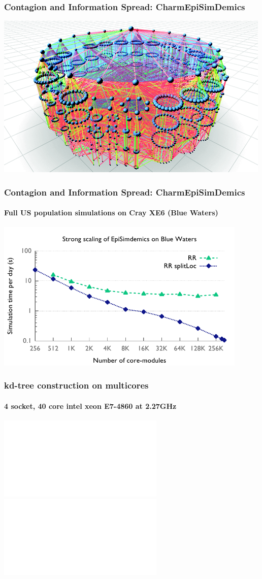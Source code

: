 \begin{frame}
\frametitle{Contagion and Information Spread: CharmEpiSimDemics}
\includegraphics[width=\textwidth]{../figures/contagion.png}
\end{frame}


\begin{frame}
\frametitle{Contagion and Information Spread: CharmEpiSimDemics}
\framesubtitle{Full US population simulations on Cray XE6 (Blue Waters)}
\begin{center}
\includegraphics[width=0.9\textwidth]{../figures/simdemics_strong_scaling.pdf}
\end{center}
\end{frame}


\begin{frame}
\frametitle{kd-tree construction on multicores}
\framesubtitle{4 socket, 40 core intel xeon E7-4860 at 2.27GHz}
\includegraphics<1>[height=\textheight]{../figures/kdtree/speedup_8.pdf}
\includegraphics<2>[height=\textheight]{../figures/kdtree/speedup_15.pdf}
\end{frame}


